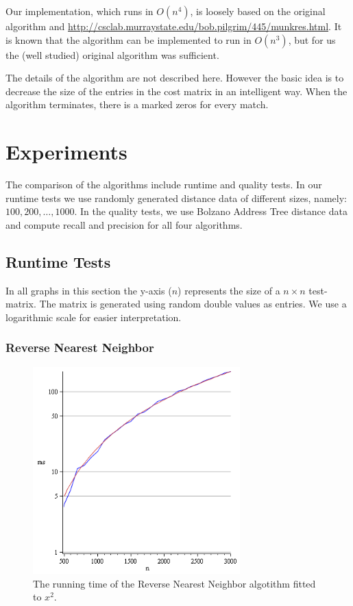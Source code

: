 \documentclass[a4paper,11pt]{article}
\begin{document}
Our implementation, which runs in $O(n^4)$, is loosely based on the original algorithm and  \url{http://csclab.murraystate.edu/bob.pilgrim/445/munkres.html}. It is known that the algorithm can be implemented to run in $O(n^3)$, but for us the (well studied) original algorithm was sufficient.

The details of the algorithm are not described here. However the basic idea is to decrease the size of the entries in the cost matrix in an intelligent way. When the algorithm terminates, there is a marked zeros for every match. 

\section{Experiments}

The comparison of the algorithms include runtime and quality tests. In our runtime tests we use randomly generated distance data of different sizes, namely: $100, 200, \dots, 1000$. In the quality tests, we use Bolzano Address Tree distance data and compute recall and precision for all four algorithms.

\subsection{Runtime Tests}

In all graphs in this section the y-axis ($n$) represents the size of a $n \times n$ test-matrix. The matrix is generated using random double values as entries. We use a logarithmic scale for easier interpretation.

\subsubsection{Reverse Nearest Neighbor}

\begin{figure}[ht!]
\centering 
\includegraphics[width=80mm]{RNN_runtime.png}
\caption{The running time of the Reverse Nearest Neighbor algotithm fitted to $x^2$.}
\label{rnn} 
\end{figure}
\end{document}
